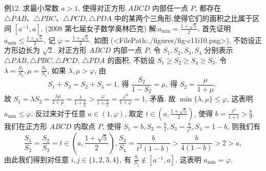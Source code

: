 例12. 求最小常数 $a>1$, 使得对正方形 $A B C D$ 内部任一点 $P$, 都存在 $\triangle P A B 、 \triangle P B C 、 \triangle P C D, \triangle P D A$ 中的某两个三角形,使得它们的面积之比属于区间 $\left[a^{-1}, a\right]$. (2008 第七届女子数学奥林匹克)
解:$a_{\min }=\frac{1+\sqrt{5}}{2}$.
首先证明 $a_{\min } \leqslant \frac{1+\sqrt{5}}{2}$, 记 $\varphi=\frac{1+\sqrt{5}}{2}$. 如图 (<FilePath:./figures/fig-c11i10.png>), 不妨设正方形边长为 $\sqrt{2}$. 对正方形 $A B C D$ 内部一点 $P$, 令 $S_1, S_2, S_3, S_4$ 分别表示 $\triangle P A B, \triangle P B C, \triangle P C D$, $\triangle P D A$ 的面积, 不妨设 $S_1 \geqslant S_2 \geqslant S_4 \geqslant S_3$.
令 $\lambda=\frac{S_1}{S_2}, \mu=\frac{S_2}{S_4}$, 如果 $\lambda, \mu>\varphi$, 由
$$
S_1+S_3=S_2+S_4=1 \text {, 得 } \frac{S_2}{1-S_2}=\mu \text {, 得 } S_2=\frac{\mu}{1+\mu} \text {. }
$$
故 $S_1=\lambda S_2=\frac{\lambda \mu}{1+\mu}=\frac{\lambda}{1+\frac{1}{\mu}}>\frac{\varphi}{1+\frac{1}{\varphi}}=\frac{\varphi^2}{1+\varphi}=1$, 矛盾.
故 $\min \{\lambda, \mu\} \leqslant \varphi$, 这表明 $a_{\min } \leqslant \varphi$.
反过来对于任意 $a \in(1, \varphi)$, 取定 $t \in\left(a, \frac{1+\sqrt{5}}{2}\right)$, 使得 $b=\frac{t^2}{1+t}>\frac{8}{9}$. 我们在正方形 $A B C D$ 内取点 $P$, 使得 $S_1=b, S_2=\frac{b}{t}, S_3=\frac{b}{t^2}, S_4=1-b$, 则我们有
$$
\frac{S_1}{S_2}=\frac{S_2}{S_3}=t \in\left(a, \frac{1+\sqrt{5}}{2}\right), \frac{S_3}{S_4}=\frac{b}{t^2(1-b)}>\frac{b}{4(1-b)}>2>a,
$$
由此我们得到对任意 $i, j \in\{1,2,3,4\}$, 有 $\frac{S_i}{S_j} \notin\left[a^{-1}, a\right]$. 这表明 $a_{\min }=\varphi$.


